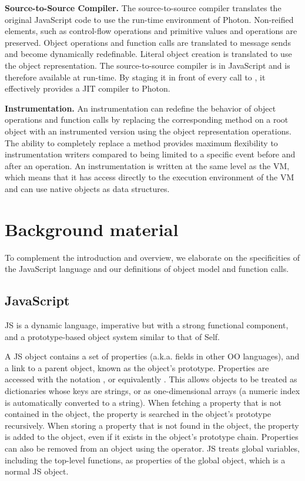 \textbf{Source-to-Source Compiler.} The source-to-source compiler translates
the original JavaScript code to use the run-time environment of Photon.
Non-reified elements, such as control-flow operations and primitive values and
operations are preserved.  Object operations and function calls are translated
to message sends and become dynamically redefinable. Literal object creation
is translated to use the object representation. The source-to-source compiler
is in JavaScript and is therefore available at run-time. By staging it in front
of every call to , it effectively provides a JIT compiler to Photon.

\textbf{Instrumentation.} An instrumentation can redefine the behavior
of object operations and function calls by replacing the corresponding method
on a root object with an instrumented version using the object representation
operations. The ability to completely replace a method provides maximum
flexibility to instrumentation writers compared to being limited to a specific
event before and after an operation. An instrumentation is written at the same
level as the VM, which means that it has access directly to the execution
environment of the VM and can use native objects as data structures.

\section{Background material}

To complement the introduction and overview, we elaborate on the specificities
of the JavaScript language and our definitions of object model and function
calls.

\subsection{JavaScript}

JS is a dynamic language, imperative but with a strong functional component,
and a prototype-based object system similar to that of Self.

A JS object contains a set of properties (a.k.a. fields in other OO languages),
and a link to a parent object, known as the object's prototype. Properties are
accessed with the notation , or equivalently .
This allows objects to be treated as dictionaries whose keys are strings, or as
one-dimensional arrays (a numeric index is automatically converted to a
string).  When fetching a property that is not contained in the object, the
property is searched in the object's prototype recursively. When storing a
property that is not found in the object, the property is added to the object,
even if it exists in the object's prototype chain. Properties can also be
removed from an object using the  operator. JS treats global
variables, including the top-level functions, as properties of the global
object, which is a normal JS object.

